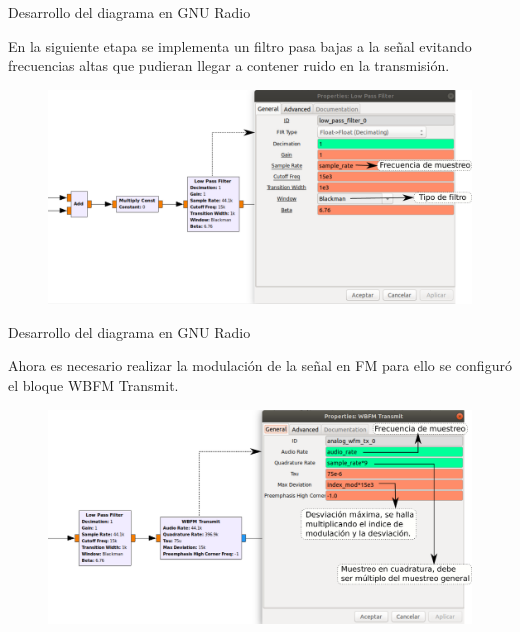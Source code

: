 \begin{frame}{Desarrollo del diagrama en GNU Radio}

En la siguiente etapa se implementa un filtro pasa bajas a la señal evitando frecuencias altas que pudieran llegar a contener ruido en la transmisión.

\begin{figure}[H]
\centering
\vspace{-3mm}
\includegraphics[width=\textwidth]{parte3/lab14/pdf/Lab14_5.pdf}
\end{figure}


\end{frame}

\begin{frame}{Desarrollo del diagrama en GNU Radio}

Ahora es necesario realizar la modulación de la señal en FM para ello se configuró el bloque WBFM Transmit.

\begin{figure}[H]
\centering
\vspace{-3mm}
\includegraphics[width=\textwidth]{parte3/lab14/pdf/Lab14_6.pdf}
\end{figure}


\end{frame}

